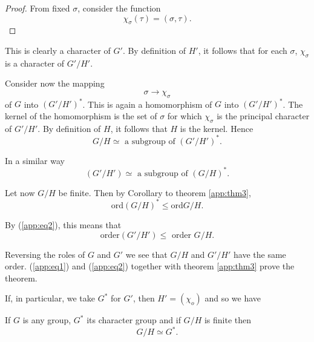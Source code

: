   \begin{proof}
From fixed $\sigma$, consider the function 
$$
\chi_\sigma(\tau) = (\sigma, \tau).
$$
  \end{proof}  
  
  This is clearly a character of $G'$. By definition of $H'$, it
  follows  that for each $\sigma$, $\chi_\sigma$ is a character of
  $G'/H'$.  
  
  Consider now the mapping
  $$
 \sigma \to  \chi_\sigma 
  $$ 
  of $G$ into $(G'/ H')^*$. This is again a homomorphism of $G$
  into $(G'/ H')^*$. The  kernel of the homomorphism is the set of
  $\sigma$ for which $\chi_{\sigma}$ is the principal character of $G'/
  H'$. By definition of $H$, it follows that  $H$ is the
  kernel. Hence  
  \begin{equation*}
G/H \simeq \text{ a subgroup of } (G'/ H')^*. \tag{1}\label{app:eq1} 
   \end{equation*}\pageoriginale   
  
 In  a similar way
    \begin{equation*}
(G'/H') \simeq \text{ a subgroup of } (G/ H)^*. \tag{2}\label{app:eq2} 
   \end{equation*}  
   
   Let now $G/H$ be finite. Then by Corollary to theorem \ref{app:thm3},  
$$
\text{ord} (G/H)^* \le \text{ord} G/H.
$$ 

By (\ref{app:eq2}), this means that
$$
\text{order} (G'/H') \leq \text{ order } G/H.  
$$
   
Reversing the roles of $G$ and $G'$  we see that $G/H$ and $G'/H'$
have the same order. (\ref{app:eq1}) and (\ref{app:eq2}) together with theorem
\ref{app:thm3} prove the theorem.  
   
If, in particular, we take $G^*$ for $G'$, then $H'=(\chi_o)$ and so
we have  

\begin{coro*}
If $G$ is any group, $G^*$ its character group and if $G/H$ is
  finite then 
$$
G/H \simeq G^*.
$$
\end{coro*}   


